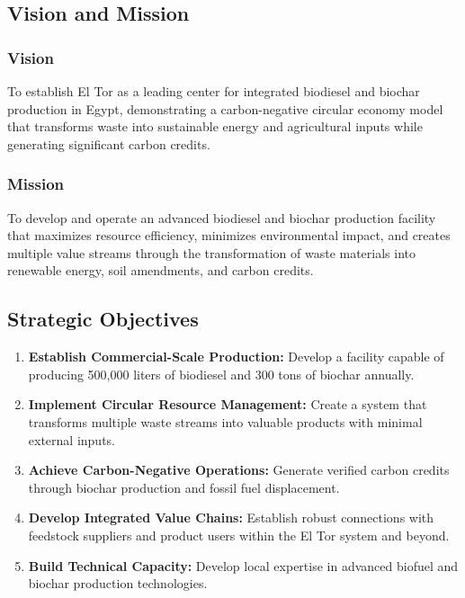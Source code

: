 \subsection{Vision and Mission}

\subsubsection{Vision}
To establish El Tor as a leading center for integrated biodiesel and biochar production in Egypt, demonstrating a carbon-negative circular economy model that transforms waste into sustainable energy and agricultural inputs while generating significant carbon credits.

\subsubsection{Mission}
To develop and operate an advanced biodiesel and biochar production facility that maximizes resource efficiency, minimizes environmental impact, and creates multiple value streams through the transformation of waste materials into renewable energy, soil amendments, and carbon credits.

\subsection{Strategic Objectives}

\begin{enumerate}
    \item \textbf{Establish Commercial-Scale Production:} Develop a facility capable of producing 500,000 liters of biodiesel and 300 tons of biochar annually.
    
    \item \textbf{Implement Circular Resource Management:} Create a system that transforms multiple waste streams into valuable products with minimal external inputs.
    
    \item \textbf{Achieve Carbon-Negative Operations:} Generate verified carbon credits through biochar production and fossil fuel displacement.
    
    \item \textbf{Develop Integrated Value Chains:} Establish robust connections with feedstock suppliers and product users within the El Tor system and beyond.
    
    \item \textbf{Build Technical Capacity:} Develop local expertise in advanced biofuel and biochar production technologies.
\end{enumerate}

